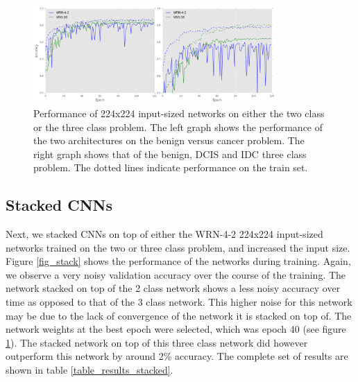 \documentclass[journal]{IEEEtran}
\begin{document}


\begin{figure}[!t]
\centering{}
\hspace{-0.42cm}\includegraphics[width=3.65in]{224_performance_dual}
\vspace{-0.35cm}\caption{Performance of 224x224 input-sized networks on either the two class or the three class problem. The left graph shows the performance of the two architectures on the benign versus cancer problem. The right graph shows that of the benign, DCIS and IDC three class problem. The dotted lines indicate performance on the train set.}
\label{fig_224_dual}
\end{figure}




\subsection{Stacked CNNs}

Next, we stacked CNNs on top of either the WRN-4-2 224x224 input-sized networks trained on the two or three class problem, and increased the input size. Figure \ref{fig_stack} shows the performance of the networks during training. Again, we observe a very noisy validation accuracy over the course of the training. The network stacked on top of the 2 class network shows a less noisy accuracy over time as opposed to that of the 3 class network. This higher noise for this network may be due to the lack of convergence of the network it is stacked on top of. The network weights at the best epoch were selected, which was epoch 40 (see figure \ref{fig_224_dual}). The stacked network on top of this three class network did however outperform this network by around 2\% accuracy. The complete set of results are shown in table \ref{table_results_stacked}. 
\end{document}
